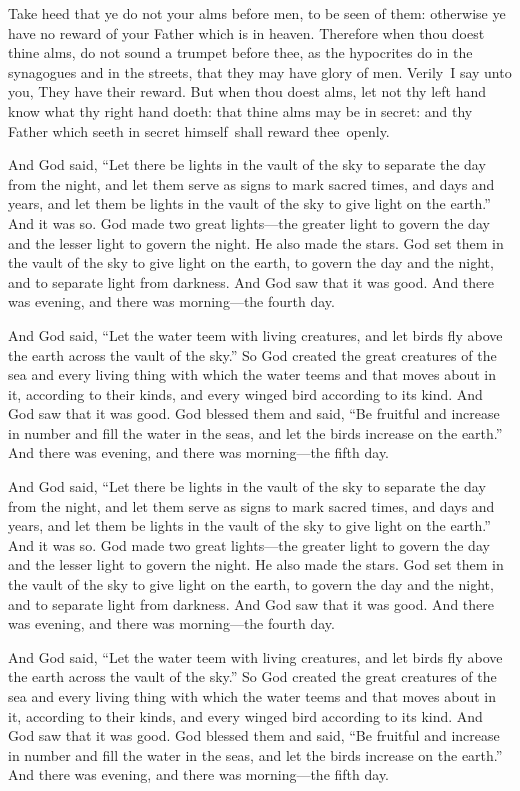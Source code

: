 \documentclass{grattanAlpha}
\begin{document}
Take heed that ye do not your alms before men, to be seen of them: otherwise ye have no reward of your Father which is in heaven. Therefore when thou doest thine alms, do not sound a trumpet before thee, as the hypocrites do in the synagogues and in the streets, that they may have glory of men. Verily~I say unto you, They have their reward.  But when thou doest alms, let not thy left hand know what thy right hand doeth: that thine alms may be in secret: and thy Father which seeth in secret himself~shall reward thee~openly.

And God said, “Let there be lights in the vault of the sky to separate the day from the night, and let them serve as signs to mark sacred times, and days and years, and let them be lights in the vault of the sky to give light on the earth.” And it was so. God made two great lights—the greater light to govern the day and the lesser light to govern the night. He also made the stars. God set them in the vault of the sky to give light on the earth, to govern the day and the night, and to separate light from darkness. And God saw that it was good. And there was evening, and there was morning—the fourth day.

And God said, “Let the water teem with living creatures, and let birds fly above the earth across the vault of the sky.” So God created the great creatures of the sea and every living thing with which the water teems and that moves about in it, according to their kinds, and every winged bird according to its kind. And God saw that it was good. God blessed them and said, “Be fruitful and increase in number and fill the water in the seas, and let the birds increase on the earth.” And there was evening, and there was morning—the fifth day.

And God said, “Let there be lights in the vault of the sky to separate the day from the night, and let them serve as signs to mark sacred times, and days and years, and let them be lights in the vault of the sky to give light on the earth.” And it was so. God made two great lights—the greater light to govern the day and the lesser light to govern the night. He also made the stars. God set them in the vault of the sky to give light on the earth, to govern the day and the night, and to separate light from darkness. And God saw that it was good. And there was evening, and there was morning—the fourth day.

And God said, “Let the water teem with living creatures, and let birds fly above the earth across the vault of the sky.” So God created the great creatures of the sea and every living thing with which the water teems and that moves about in it, according to their kinds, and every winged bird according to its kind. And God saw that it was good. God blessed them and said, “Be fruitful and increase in number and fill the water in the seas, and let the birds increase on the earth.” And there was evening, and there was morning—the fifth day.
\end{document}
